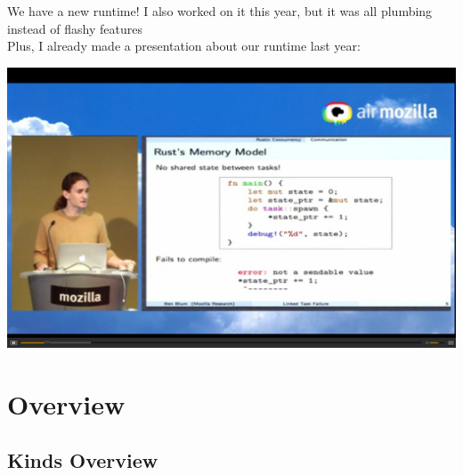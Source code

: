 \documentclass[xcolor=dvipsnames]{beamer}
\begin{document}
\begin{frame}{We have a new runtime!}
	I also worked on it this year, but it was all plumbing instead of flashy features \\
	\linegap
	Plus, I already made a presentation about our runtime last year:
\end{frame}
\begin{frame}[plain]
	\hspace{-2em}\includegraphics[width=1.0\paperwidth]{last-year.png}
\end{frame}

\section{Overview}

\newcommand\code[1]{{\begin{center}\fbox{\begin{tabular}{l} #1 \end{tabular}} \end{center}}}



\subsection{Kinds Overview}
\end{document}
